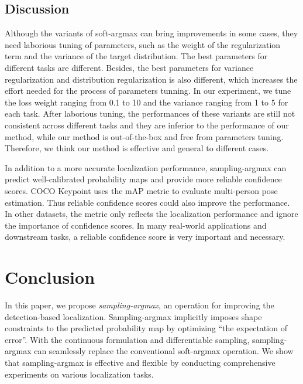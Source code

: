 \documentclass{article}
\begin{document}
\subsection{Discussion}
Although the variants of soft-argmax can bring improvements in some cases, they need laborious tuning of parameters, such as the weight of the regularization term and the variance of the target distribution. The best parameters for different tasks are different. Besides, the best parameters for variance regularization and distribution regularization is also different, which increases the effort needed for the process of parameters tunning. In our experiment, we tune the loss weight ranging from 0.1 to 10 and the variance ranging from 1 to 5 for each task. After laborious tuning, the performances of these variants are still not consistent across different tasks and they are inferior to the performance of our method, while our method is out-of-the-box and free from parameters tuning. Therefore, we think our method is effective and general to different cases.

In addition to a more accurate localization performance, sampling-argmax can predict well-calibrated probability maps and provide more reliable confidence scores. COCO Keypoint uses the mAP metric to evaluate multi-person pose estimation. Thus reliable confidence scores could also improve the performance. In other datasets, the metric only reflects the localization performance and ignore the importance of confidence scores. In many real-world applications and downstream tasks, a reliable confidence score is very important and necessary.
 
\section{Conclusion}

In this paper, we propose \textit{sampling-argmax}, an operation for improving the detection-based localization. Sampling-argmax implicitly imposes shape constraints to the predicted probability map by optimizing ``the expectation of error''. With the continuous formulation and differentiable sampling, sampling-argmax can seamlessly replace the conventional soft-argmax operation. We show that sampling-argmax is effective and flexible by conducting comprehensive experiments on various localization tasks.
 






\appendix
\end{document}

